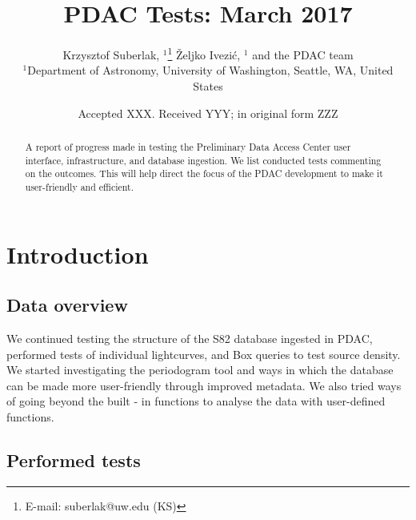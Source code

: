 \documentclass[fleqn,usenatbib, onecolumn]{mnras} %
\title[PDAC progress]{PDAC Tests: March 2017}
\author[K. Suberlak et al. ]{
Krzysztof Suberlak, $^{1}$\thanks{E-mail: suberlak@uw.edu (KS)}
\v{Z}eljko Ivezi\'c, $^{1}$ and the PDAC team  
\\
$^{1}$Department of Astronomy, University of Washington, Seattle, WA, United States\\
}
\date{Accepted XXX. Received YYY; in original form ZZZ}
\begin{document}
\label{firstpage}
\pagerange{\pageref{firstpage}--\pageref{lastpage}}
\maketitle

\begin{abstract}
A report of progress made in testing the Preliminary Data Access Center user interface, infrastructure, and database ingestion.  We list conducted tests commenting on the outcomes. This will help direct the focus of the PDAC development to make it user-friendly and efficient. 
\end{abstract}




\section*{Introduction}

\subsection*{Data overview}
We continued testing the structure of the S82 database ingested in PDAC,  performed tests of individual lightcurves, and Box queries to test source density. We started investigating the periodogram tool and ways in which the database can be made more user-friendly through improved  metadata.  We also tried ways of going beyond the built - in functions to analyse the data with user-defined functions. 


\subsection*{Performed tests}
\end{document}

